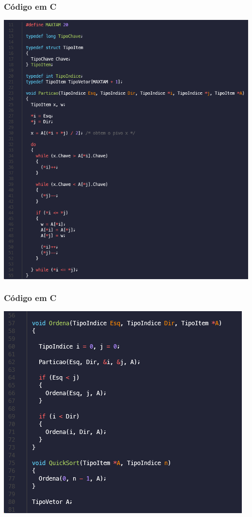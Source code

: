 \documentclass[
	11pt, %
]{beamer}
\begin{document}
\begin{frame}
	\frametitle{Código em C}
	\includegraphics[width=0.7\linewidth]{quick_sort_in_c_particao}
\end{frame}
\begin{frame}
	\frametitle{Código em C}
	\includegraphics[width=0.7\linewidth]{quick_sort_in_c_ordena}
\end{frame}
\end{document}
